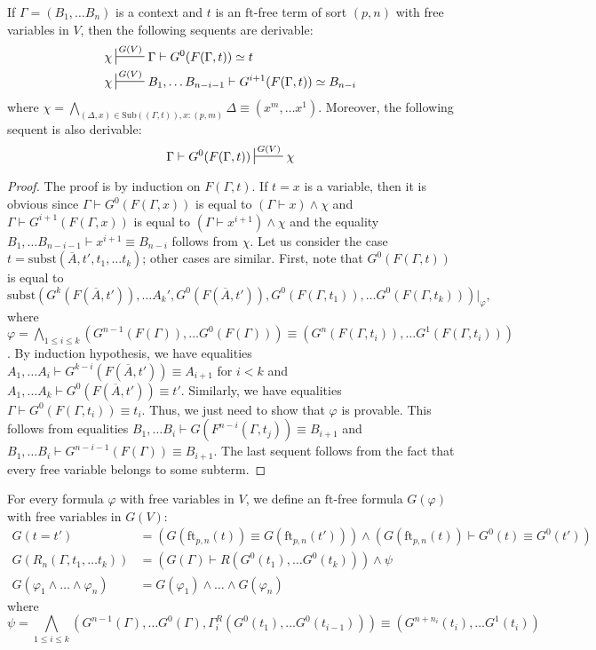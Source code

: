 \documentclass[reqno]{amsart}
\theoremstyle{definition}
\theoremstyle{remark}
\newcommand{\fs}[1]{\mathrm{#1}}
\newcommand{\subst}{\fs{subst}}
\newcommand{\ft}{\fs{ft}}
\newcommand{\sub}{\fs{Sub}}
\numberwithin{figure}{section}
\begin{document}
\begin{lem}
If $\Gamma = (B_1, \ldots B_n)$ is a context and $t$ is an $\ft$-free term of sort $(p,n)$ with free variables in $V$, then the following sequents are derivable:
\begin{align*}
\chi & \sststile{}{G(V)} \Gamma \vdash G^0(F(\Gamma,t)) \simeq t \\
\chi & \sststile{}{G(V)} B_1, \ldots B_{n-i-1} \vdash G^{i+1}(F(\Gamma,t)) \simeq B_{n-i}
\end{align*}
where $\chi = \bigwedge_{(\Delta,x) \in \sub((\Gamma,t)), x : (p,m)} \Delta \equiv (x^m, \ldots x^1)$.
Moreover, the following sequent is also derivable:
\[ \Gamma \vdash G^0(F(\Gamma,t)) \sststile{}{G(V)} \chi \]
\end{lem}
\begin{proof}
The proof is by induction on $F(\Gamma,t)$.
If $t = x$ is a variable, then it is obvious since $\Gamma \vdash G^0(F(\Gamma,x))$ is equal to $(\Gamma \vdash x) \land \chi$ and $\Gamma \vdash G^{i+1}(F(\Gamma,x))$ is equal to $(\Gamma \vdash x^{i+1}) \land \chi$ and the equality $B_1, \ldots B_{n-i-1} \vdash x^{i+1} \equiv B_{n-i}$ follows from $\chi$.
Let us consider the case $t = \subst(\overline{A}, t', t_1, \ldots t_k)$; other cases are similar.
First, note that $G^0(F(\Gamma,t))$ is equal to
\[ \subst(G^k(F(\overline{A},t')), \ldots A_k', G^0(F(\overline{A},t')), G^0(F(\Gamma,t_1)), \ldots G^0(F(\Gamma,t_k)))|_\varphi, \]
where $\varphi = \bigwedge_{1 \leq i \leq k} (G^{n-1}(F(\Gamma)), \ldots G^0(F(\Gamma))) \equiv (G^n(F(\Gamma,t_i)), \ldots G^1(F(\Gamma,t_i)))$.
By induction hypothesis, we have equalities $A_1, \ldots A_i \vdash G^{k-i}(F(\overline{A},t')) \equiv A_{i+1}$ for $i < k$ and $A_1, \ldots A_k \vdash G^0(F(\overline{A},t')) \equiv t'$.
Similarly, we have equalities $\Gamma \vdash G^0(F(\Gamma,t_i)) \equiv t_i$.
Thus, we just need to show that $\varphi$ is provable.
This follows from equalities $B_1, \ldots B_i \vdash G(F^{n-i}(\Gamma,t_j)) \equiv B_{i+1}$ and $B_1, \ldots B_i \vdash G^{n-i-1}(F(\Gamma)) \equiv B_{i+1}$.
The last sequent follows from the fact that every free variable belongs to some subterm.
\end{proof}

For every formula $\varphi$ with free variables in $V$, we define an $\ft$-free formula $G(\varphi)$ with free variables in $G(V)$:
\begin{align*}
G(t = t') & = (G(\ft_{p,n}(t)) \equiv G(\ft_{p,n}(t'))) \land (G(\ft_{p,n}(t)) \vdash G^0(t) \equiv G^0(t')) \\
G(R_n(\Gamma, t_1, \ldots t_k)) & = (G(\Gamma) \vdash R(G^0(t_1), \ldots G^0(t_k))) \land \psi \\
G(\varphi_1 \land \ldots \land \varphi_n) & = G(\varphi_1) \land \ldots \land G(\varphi_n)
\end{align*}
 where
 \[ \psi = \bigwedge_{1 \leq i \leq k} (G^{n-1}(\Gamma), \ldots G^0(\Gamma), \Gamma^R_i(G^0(t_1), \ldots G^0(t_{i-1}))) \equiv (G^{n+n_i}(t_i), \ldots G^1(t_i)) \]
\end{document}
